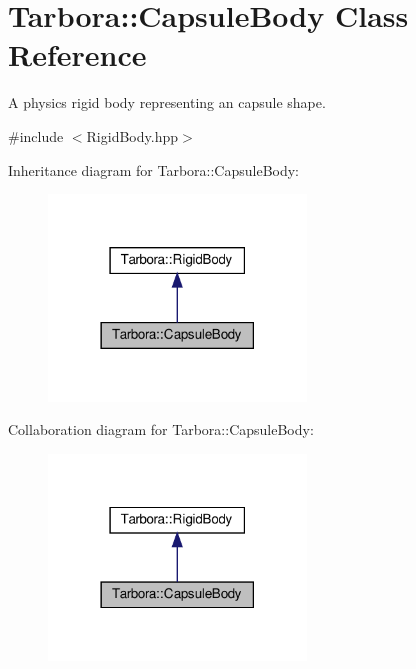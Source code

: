 \hypertarget{classTarbora_1_1CapsuleBody}{}\section{Tarbora\+:\+:Capsule\+Body Class Reference}
\label{classTarbora_1_1CapsuleBody}


A physics rigid body representing an capsule shape.  




{\ttfamily \#include $<$Rigid\+Body.\+hpp$>$}



Inheritance diagram for Tarbora\+:\+:Capsule\+Body\+:
\nopagebreak
\begin{figure}[H]
\begin{center}
\leavevmode
\includegraphics[width=194pt]{classTarbora_1_1CapsuleBody__inherit__graph}
\end{center}
\end{figure}


Collaboration diagram for Tarbora\+:\+:Capsule\+Body\+:
\nopagebreak
\begin{figure}[H]
\begin{center}
\leavevmode
\includegraphics[width=194pt]{classTarbora_1_1CapsuleBody__coll__graph}
\end{center}
\end{figure}
